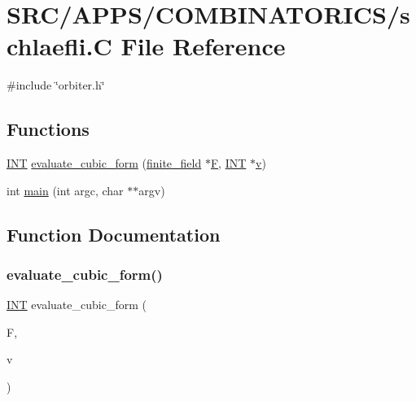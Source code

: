 \hypertarget{schlaefli_8_c}{}\section{S\+R\+C/\+A\+P\+P\+S/\+C\+O\+M\+B\+I\+N\+A\+T\+O\+R\+I\+C\+S/schlaefli.C File Reference}
\label{schlaefli_8_c}
{\ttfamily \#include \char`\"{}orbiter.\+h\char`\"{}}\newline
\subsection*{Functions}
\begin{DoxyCompactItemize}
\item 
\mbox{\hyperlink{galois_8h_a09fddde158a3a20bd2dcadb609de11dc}{I\+NT}} \mbox{\hyperlink{schlaefli_8_c_aba17c66e4dd2bd3648c8ff3f9395a2ab}{evaluate\+\_\+cubic\+\_\+form}} (\mbox{\hyperlink{classfinite__field}{finite\+\_\+field}} $\ast$\mbox{\hyperlink{simeon_8_c_a21a61c535ff7d9d4b674461d3b19fffa}{F}}, \mbox{\hyperlink{galois_8h_a09fddde158a3a20bd2dcadb609de11dc}{I\+NT}} $\ast$\mbox{\hyperlink{simeon_8_c_aeb3f3030944801b163bc3b829a7f6710}{v}})
\item 
int \mbox{\hyperlink{schlaefli_8_c_a3c04138a5bfe5d72780bb7e82a18e627}{main}} (int argc, char $\ast$$\ast$argv)
\end{DoxyCompactItemize}


\subsection{Function Documentation}
\mbox{\label{schlaefli_8_c_aba17c66e4dd2bd3648c8ff3f9395a2ab}} 
\subsubsection{\texorpdfstring{evaluate\+\_\+cubic\+\_\+form()}{evaluate\_cubic\_form()}}
{\footnotesize\ttfamily \mbox{\hyperlink{galois_8h_a09fddde158a3a20bd2dcadb609de11dc}{I\+NT}} evaluate\+\_\+cubic\+\_\+form (\begin{DoxyParamCaption}\item[{\mbox{\hyperlink{classfinite__field}{finite\+\_\+field}} $\ast$}]{F,  }\item[{\mbox{\hyperlink{galois_8h_a09fddde158a3a20bd2dcadb609de11dc}{I\+NT}} $\ast$}]{v }\end{DoxyParamCaption})}

